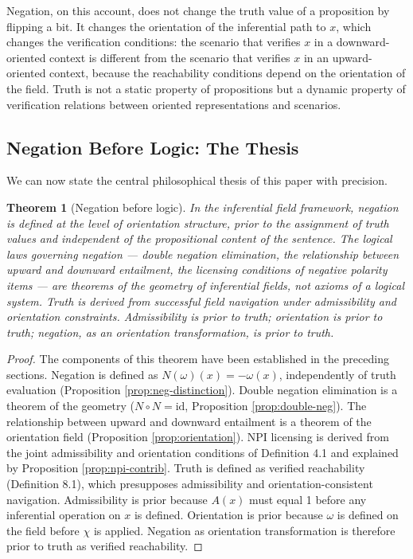 \documentclass[12pt]{article}
\newtheorem{theorem}{Theorem}[section]
\theoremstyle{remark}
\begin{document}
Negation, on this account, does not change the truth value of a
proposition by flipping a bit. It changes the orientation of the
inferential path to $x$, which changes the verification conditions:
the scenario that verifies $x$ in a downward-oriented context is
different from the scenario that verifies $x$ in an upward-oriented
context, because the reachability conditions depend on the orientation
of the field. Truth is not a static property of propositions but a
dynamic property of verification relations between oriented
representations and scenarios.

\subsection{Negation Before Logic: The Thesis}

We can now state the central philosophical thesis of this paper with
precision.

\begin{theorem}[Negation before logic]
\label{thm:nbl}
In the inferential field framework, negation is defined at the level of
orientation structure, prior to the assignment of truth values and
independent of the propositional content of the sentence. The logical
laws governing negation --- double negation elimination, the relationship
between upward and downward entailment, the licensing conditions of
negative polarity items --- are theorems of the geometry of inferential
fields, not axioms of a logical system. Truth is derived from successful
field navigation under admissibility and orientation constraints.
Admissibility is prior to truth; orientation is prior to truth;
negation, as an orientation transformation, is prior to truth.
\end{theorem}

\begin{proof}
The components of this theorem have been established in the preceding
sections. Negation is defined as $N(\omega)(x) = -\omega(x)$,
independently of truth evaluation (Proposition
\ref{prop:neg-distinction}). Double negation elimination is a theorem
of the geometry ($N \circ N = \mathrm{id}$, Proposition
\ref{prop:double-neg}). The relationship between upward and downward
entailment is a theorem of the orientation field (Proposition
\ref{prop:orientation}). NPI licensing is derived from the joint
admissibility and orientation conditions of Definition 4.1 and explained
by Proposition \ref{prop:npi-contrib}. Truth is defined as verified
reachability (Definition 8.1), which presupposes admissibility and
orientation-consistent navigation. Admissibility is prior because
$A(x)$ must equal 1 before any inferential operation on $x$ is defined.
Orientation is prior because $\omega$ is defined on the field before
$\chi$ is applied. Negation as orientation transformation is therefore
prior to truth as verified reachability.
\end{proof}
\end{document}
